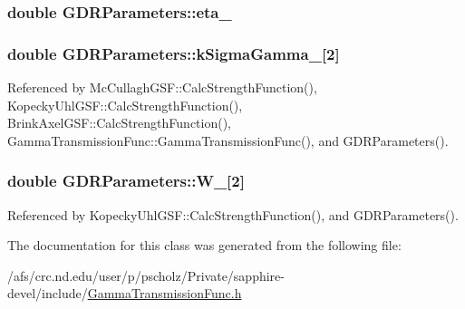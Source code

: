 \hypertarget{classGDRParameters_ad934d0d1a4a3ad93326f9af97eeb9d7c}{
\subsubsection[{eta\-\_\-}]{\setlength{\rightskip}{0pt plus 5cm}double G\-D\-R\-Parameters\-::eta\-\_\-}}\label{classGDRParameters_ad934d0d1a4a3ad93326f9af97eeb9d7c}
\hypertarget{classGDRParameters_afd7899667da29eab4842a6e1389b3386}{
\subsubsection[{k\-Sigma\-Gamma\-\_\-}]{\setlength{\rightskip}{0pt plus 5cm}double G\-D\-R\-Parameters\-::k\-Sigma\-Gamma\-\_\-\mbox{[}2\mbox{]}}}\label{classGDRParameters_afd7899667da29eab4842a6e1389b3386}


Referenced by Mc\-Cullagh\-G\-S\-F\-::\-Calc\-Strength\-Function(), Kopecky\-Uhl\-G\-S\-F\-::\-Calc\-Strength\-Function(), Brink\-Axel\-G\-S\-F\-::\-Calc\-Strength\-Function(), Gamma\-Transmission\-Func\-::\-Gamma\-Transmission\-Func(), and G\-D\-R\-Parameters().

\hypertarget{classGDRParameters_ab907ef31caef7af38a2ed6bc8a45e365}{
\subsubsection[{W\-\_\-}]{\setlength{\rightskip}{0pt plus 5cm}double G\-D\-R\-Parameters\-::\-W\-\_\-\mbox{[}2\mbox{]}}}\label{classGDRParameters_ab907ef31caef7af38a2ed6bc8a45e365}


Referenced by Kopecky\-Uhl\-G\-S\-F\-::\-Calc\-Strength\-Function(), and G\-D\-R\-Parameters().



The documentation for this class was generated from the following file\-:\begin{DoxyCompactItemize}
\item 
/afs/crc.\-nd.\-edu/user/p/pscholz/\-Private/sapphire-\/devel/include/\hyperlink{GammaTransmissionFunc_8h}{Gamma\-Transmission\-Func.\-h}\end{DoxyCompactItemize}
